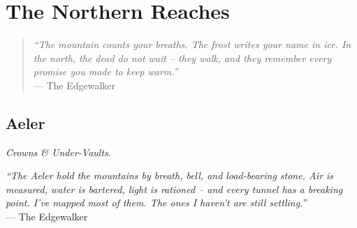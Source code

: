 \documentclass[12pt,oneside]{book}
\begin{document}


\part{The Northern Reaches}

\begin{quote}
  \small
  \textit{``The mountain counts your breaths. The frost writes your name in ice. In the north, the dead do not wait -- they walk, and they remember every promise you made to keep warm.''}
  \\ --- The Edgewalker
\end{quote}

\chapter{Aeler}
\emph{Crowns \& Under-Vaults.}

\noindent
\textit{``The Aeler hold the mountains by breath, bell, and load-bearing stone. Air is measured, water is bartered, light is rationed -- and every tunnel has a breaking point. I've mapped most of them. The ones I haven't are still settling.''} \\
--- The Edgewalker
\end{document}
